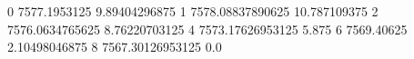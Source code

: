 0 7577.1953125 9.89404296875
1 7578.08837890625 10.787109375
2 7576.0634765625 8.76220703125
4 7573.17626953125 5.875
6 7569.40625 2.10498046875
8 7567.30126953125 0.0
